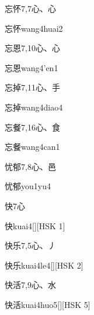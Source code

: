\begin{entry}{忘怀}{7,7}{⼼、⼼}
  \begin{phonetics}{忘怀}{wang4huai2}
  \end{phonetics}
\end{entry}

\begin{entry}{忘恩}{7,10}{⼼、⼼}
  \begin{phonetics}{忘恩}{wang4'en1}
  \end{phonetics}
\end{entry}

\begin{entry}{忘掉}{7,11}{⼼、⼿}
  \begin{phonetics}{忘掉}{wang4diao4}
  \end{phonetics}
\end{entry}

\begin{entry}{忘餐}{7,16}{⼼、⾷}
  \begin{phonetics}{忘餐}{wang4can1}
  \end{phonetics}
\end{entry}

\begin{entry}{忧郁}{7,8}{⼼、⾢}
  \begin{phonetics}{忧郁}{you1yu4}
  \end{phonetics}
\end{entry}

\begin{entry}{快}{7}{⼼}
  \begin{phonetics}{快}{kuai4}[][HSK 1]
  \end{phonetics}
\end{entry}

\begin{entry}{快乐}{7,5}{⼼、⼃}
  \begin{phonetics}{快乐}{kuai4le4}[][HSK 2]
  \end{phonetics}
\end{entry}

\begin{entry}{快活}{7,9}{⼼、⽔}
  \begin{phonetics}{快活}{kuai4huo5}[][HSK 5]
  \end{phonetics}
\end{entry}

